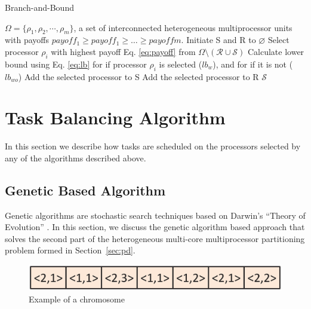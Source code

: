\documentclass[conference]{IEEEtran}
\begin{document}
\begin{algorithm} 
	\caption{Branch-and-Bound} \label{algo:bab}
	\footnotesize
	\begin{algorithmic}[1]
		\REQUIRE $\Omega = \{\rho_1, \rho_2,\cdots, \rho_m\}$, a set of interconnected heterogeneous multiprocessor units with payoffs $payoff_{1} \ge payoff_{1} \ge \ldots \ge payoff{m}$.
		\STATE Initiate {\cal S} and {\cal R} to $\varnothing$
		 \label{while1}
			\STATE Select processor $\rho_i$ with highest payoff Eq. \ref{eq:payoff} from $\Omega \setminus (\mathcal{R} \cup \mathcal{S})$
			\STATE Calculate lower bound using Eq. \ref{eq:lb} for if processor $\rho_i$ is selected ($lb_w$), and for if it is not ($lb_{wo}$)
			 \label{if1}
				\STATE Add the selected processor to {\cal S}
			\ELSE \label{else1}
				\STATE Add the selected processor to {\cal R}
			\ENDIF
		\ENDWHILE 
		\RETURN $\mathcal{S}$ \label{return1}
	\end{algorithmic}
\end{algorithm}



\section{Task Balancing Algorithm}
In this section we describe how tasks are scheduled on the processors selected by any of the algorithms described above.

\subsection{Genetic Based Algorithm}
Genetic algorithms are stochastic search techniques based on Darwin's ``Theory of Evolution'' \cite{Goldberg}.
In this section, we discuss the genetic algorithm based approach that solves the second part of the heterogeneous multi-core multiprocessor partitioning problem formed in Section~\ref{sec:pd}.


\begin{figure}[h]
\vspace{-0.1in}
	\begin{center}
		\includegraphics[scale=0.35]{chromo.eps}
	\end{center}
	\vspace{-0.2in}
		\caption{Example of a chromosome}
	\label{fig:chromosome}
\end{figure}
\vspace{-0.1in}
\end{document}
